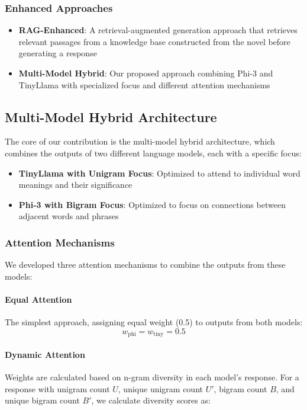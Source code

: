 \documentclass[conference]{IEEEtran}
\begin{document}
\subsubsection{Enhanced Approaches}
\begin{itemize}
    \item \textbf{RAG-Enhanced}: A retrieval-augmented generation approach that retrieves relevant passages from a knowledge base constructed from the novel before generating a response
    \item \textbf{Multi-Model Hybrid}: Our proposed approach combining Phi-3 and TinyLlama with specialized focus and different attention mechanisms
\end{itemize}

\subsection{Multi-Model Hybrid Architecture}
The core of our contribution is the multi-model hybrid architecture, which combines the outputs of two different language models, each with a specific focus:

\begin{itemize}
    \item \textbf{TinyLlama with Unigram Focus}: Optimized to attend to individual word meanings and their significance
    \item \textbf{Phi-3 with Bigram Focus}: Optimized to focus on connections between adjacent words and phrases
\end{itemize}

\subsubsection{Attention Mechanisms}
We developed three attention mechanisms to combine the outputs from these models:

\paragraph{Equal Attention}
The simplest approach, assigning equal weight (0.5) to outputs from both models:
\begin{equation}
w_{\text{phi}} = w_{\text{tiny}} = 0.5
\end{equation}

\paragraph{Dynamic Attention}
Weights are calculated based on n-gram diversity in each model's response. For a response with unigram count $U$, unique unigram count $U'$, bigram count $B$, and unique bigram count $B'$, we calculate diversity scores as:
\end{document}

